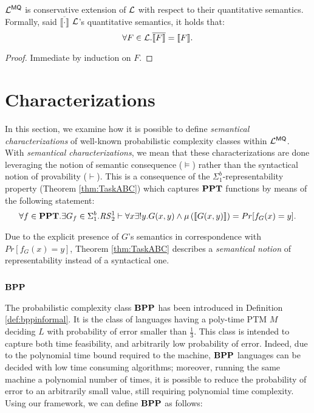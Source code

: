 \begin{remark}
  \label{rem:lpwlmq}
  $\mathcal{L}^{\mathsf{MQ}}$ is  conservative extension of $\mathcal{L}$ with respect to their quantitative semantics.
  Formally, said $\overline{\llbracket \cdot \rrbracket}$ $\mathcal{L}$'s quantitative semantics, it holds that:
  $$
  \forall F \in \mathcal{L}.  \overline{\llbracket F\rrbracket} = \llbracket F\rrbracket.
  $$
\end{remark}

\begin{proof}
  Immediate by induction on $F$.
\end{proof}











\section{Characterizations}
\label{sec:charcompclass}

In this section, we examine how it is possible to define
\emph{semantical characterizations} of well-known probabilistic complexity classes
within $\mathcal{L}^{\mathsf{MQ}}$.
%
With \emph{semantical characterizations}, we mean that these characterizations
are done leveraging the notion of semantic consequence ($\models$)
rather than the syntactical notion of provability ($\vdash$).
%
This is a consequence of the $\Sigma^b_1$-representability property (Theorem \ref{thm:TaskABC})
which captures $\mathbf{PPT}$ functions by means of the following statement:
\[
\forall f \in \mathbf{PPT}.\exists G_f \in \Sigma^b_1. {\mathit{RS}^1_2} \vdash \forall x \exists ! y. G(x, y) \land \mu\left(\llbracket G(x, y) \rrbracket\right)=Pr[f_G(x)=y].
\]

Due to the explicit presence of $G$'s semantics in correspondence with $Pr[f_G(x)=y]$,
Theorem \ref{thm:TaskABC} describes a \emph{semantical notion}
of representability instead of a syntactical one.





\subsection{$\mathbf{BPP}$}

The probabilistic complexity class
$\mathbf{BPP}$ has been introduced in Definition \ref{def:bppinformal}.
It is the class of languages having a poly-time PTM $M$
deciding $L$ with probability of error smaller than $\frac 1 3$.
This class is intended to capture both time feasibility,
and arbitrarily low probability of error.
Indeed, due to the polynomial
time bound required to the machine, $\mathbf{BPP}$ languages can be decided
with low time consuming algorithms; moreover, running
the same machine a polynomial number of times,
it is possible to reduce the probability of error to an
arbitrarily small value, still requiring polynomial time complexity.
Using our framework, we can define $\mathbf{BPP}$ as follows:

